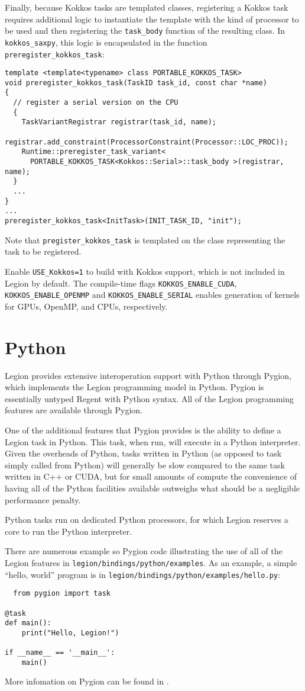Finally, because Kokkos tasks are templated classes, registering a Kokkos task requires additional logic to instantiate the template with the kind of processor to be used and then registering the
{\tt task\_body} function of the resulting class.  In {\tt kokkos\_saxpy}, this logic is encapsulated in the function {\tt preregister\_kokkos\_task}:
\begin{lstlisting}
template <template<typename> class PORTABLE_KOKKOS_TASK>
void preregister_kokkos_task(TaskID task_id, const char *name)
{
  // register a serial version on the CPU
  {
    TaskVariantRegistrar registrar(task_id, name);
    registrar.add_constraint(ProcessorConstraint(Processor::LOC_PROC));
    Runtime::preregister_task_variant<
      PORTABLE_KOKKOS_TASK<Kokkos::Serial>::task_body >(registrar, name);
  }
  ...
}
...
preregister_kokkos_task<InitTask>(INIT_TASK_ID, "init");  
\end{lstlisting}
Note that {\tt pregister\_kokkos\_task} is templated on the class representing the task to be registered.

Enable {\tt USE\_Kokkos=1} to build with Kokkos support, which is not included in Legion by default.
The compile-time flags {\tt KOKKOS\_ENABLE\_CUDA}, {\tt KOKKOS\_ENABLE\_OPENMP} and {\tt KOKKOS\_ENABLE\_SERIAL} enables
generation of kernels for GPUs, OpenMP, and CPUs, respectively.

\section{Python}
\label{sec:python}

Legion provides extensive interoperation support with Python through Pygion, which implements the Legion programming model
in Python.  Pygion is essentially untyped Regent with Python syntax.  All of the Legion programming features are available
through Pygion.

One of the additional features that Pygion provides is the ability to define a Legion task in Python.  This task, when run,
will execute in a Python interpreter.  Given the overheads of Python, tasks written in Python (as opposed to task simply
called from Python) will generally be slow compared to the same task written in C++ or CUDA, but for small amounts of compute
the convenience of having all of the Python facilities available outweighs what should be a negligible performance penalty.

Python tasks run on dedicated Python processors, for which Legion reserves a core to run
the Python interpreter.

There are numerous example so Pygion code illustrating the use of all of the Legion features in
{\tt legion/bindings/python/examples}.  As an example, a simple ``hello, world'' program is in
{\tt legion/bindings/python/examples/hello.py}:
\begin{lstlisting}
  from pygion import task

@task
def main():
    print("Hello, Legion!")

if __name__ == '__main__':
    main()
\end{lstlisting}
More infomation on Pygion can be found in \cite{pygion19}.


